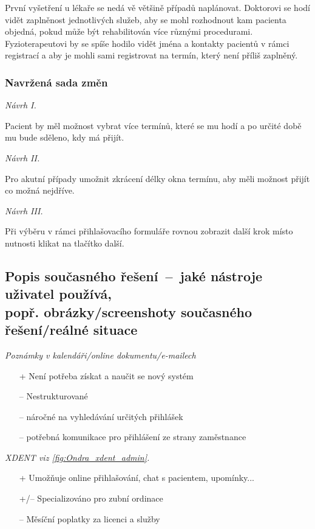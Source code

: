 První vyšetření u lékaře se nedá vě většině případů naplánovat. Doktorovi se hodí vidět zaplněnost jednotlivých služeb, aby se mohl rozhodnout kam pacienta objedná, pokud může být rehabilitován více různými procedurami.
Fyzioterapeutovi by se spíše hodilo vidět jména a kontakty pacientů v rámci registrací a aby je mohli sami registrovat na termín, který není příliš zaplněný.


\subsubsection*{Navržená sada změn}
\noindent\emph{Návrh I.}

Pacient by měl možnost vybrat více termínů, které se mu hodí a po určité době mu bude sděleno, kdy má přijít.

\noindent\emph{Návrh II.}

Pro akutní případy umožnit zkrácení délky okna termínu, aby měli možnost přijít co možná nejdříve.

\noindent\emph{Návrh III.}

Při výběru v rámci přihlašovacího formuláře rovnou zobrazit další krok místo nutnosti klikat na tlačítko další.

\subsection{Popis současného řešení\ --\ jaké nástroje uživatel používá, \\
popř. obrázky/screenshoty současného řešení/reálné situace}

\noindent\emph{Poznámky v kalendáři/online dokumentu/e-mailech} 
\begin{itemize}
    \item[+] Není potřeba získat a naučit se nový systém
    \item[--] Nestrukturované
    \item[--] náročné na vyhledávání určitých přihlášek
    \item[--] potřebná komunikace pro přihlášení ze strany zaměstnance
\end{itemize}

\noindent\emph{XDENT viz \ref{fig:Ondra_xdent_admin}.}
\begin{itemize}
    \item[+] Umožňuje online přihlašování, chat s pacientem, upomínky...
    \item[+/--] Specializováno pro zubní ordinace
    \item[--] Měsíční poplatky za licenci a služby 
\end{itemize}

